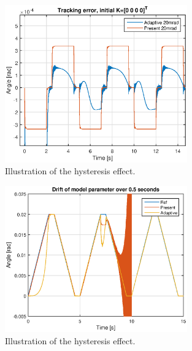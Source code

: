 \begin{figure}[h!]
  \centering
  \includegraphics[width=0.7\textwidth]{fig/matlab/trackingerror.eps}
  \caption{\label{fig:hysteresis}Illustration of the hysteresis effect.}
\end{figure}

\begin{figure}[h!]
  \centering
  \includegraphics[width=0.7\textwidth]{fig/matlab/driftofmodelparameterover05s.eps}
  \caption{\label{fig:hysteresis}Illustration of the hysteresis effect.}
\end{figure}

